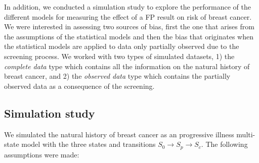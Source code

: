 \documentclass{bmcart}
\begin{document}
In addition, we conducted a simulation study to explore the performance of the different models for
measuring the effect of a FP result on risk of breast cancer. We were interested in
assessing two sources of bias, first the one that arises from the assumptions of the statistical
models and then the bias that originates when the statistical models are applied to data only
partially observed due to the screening process. We worked with two types of simulated datasets, 1)
the \textit{complete data} type which contains all the information on the natural history of breast
cancer, and 2) the \textit{observed data} type which contains the partially observed data as a
consequence of the screening.

\subsection*{Simulation study}
We simulated the natural history of breast cancer as an progressive illness multi-state model with
the three states and transitions $S_0 \rightarrow S_p \rightarrow S_c$. The following assumptions
were made:
\end{document}
